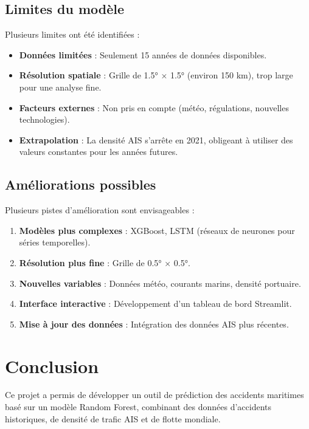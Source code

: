 \documentclass[12pt, a4paper]{report}
\begin{document}
\section{Limites du modèle}

Plusieurs limites ont été identifiées :

\begin{itemize}
    \item \textbf{Données limitées} : Seulement 15 années de données disponibles.
    \item \textbf{Résolution spatiale} : Grille de 1.5° × 1.5° (environ 150 km), trop large pour une analyse fine.
    \item \textbf{Facteurs externes} : Non pris en compte (météo, régulations, nouvelles technologies).
    \item \textbf{Extrapolation} : La densité AIS s'arrête en 2021, obligeant à utiliser des valeurs constantes pour les années futures.
\end{itemize}

\section{Améliorations possibles}

Plusieurs pistes d'amélioration sont envisageables :

\begin{enumerate}
    \item \textbf{Modèles plus complexes} : XGBoost, LSTM (réseaux de neurones pour séries temporelles).
    \item \textbf{Résolution plus fine} : Grille de 0.5° × 0.5°.
    \item \textbf{Nouvelles variables} : Données météo, courants marins, densité portuaire.
    \item \textbf{Interface interactive} : Développement d'un tableau de bord Streamlit.
    \item \textbf{Mise à jour des données} : Intégration des données AIS plus récentes.
\end{enumerate}

\chapter{Conclusion}

Ce projet a permis de développer un outil de prédiction des accidents maritimes basé sur un modèle Random Forest, combinant des données d'accidents historiques, de densité de trafic AIS et de flotte mondiale.
\end{document}
